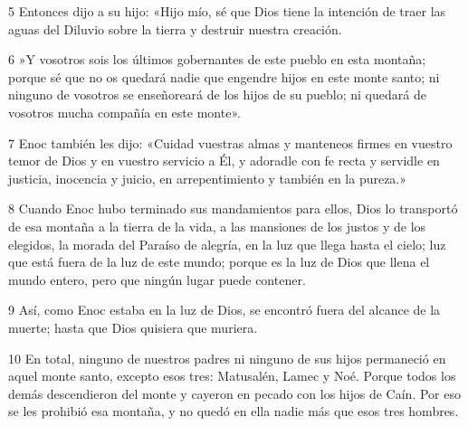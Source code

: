 \par 5 Entonces dijo a su hijo: «Hijo mío, sé que Dios tiene la intención de traer las aguas del Diluvio sobre la tierra y destruir nuestra creación.

\par 6 »Y vosotros sois los últimos gobernantes de este pueblo en esta montaña; porque sé que no os quedará nadie que engendre hijos en este monte santo; ni ninguno de vosotros se enseñoreará de los hijos de su pueblo; ni quedará de vosotros mucha compañía en este monte».

\par 7 Enoc también les dijo: «Cuidad vuestras almas y manteneos firmes en vuestro temor de Dios y en vuestro servicio a Él, y adoradle con fe recta y servidle en justicia, inocencia y juicio, en arrepentimiento y también en la pureza.»

\par 8 Cuando Enoc hubo terminado sus mandamientos para ellos, Dios lo transportó de esa montaña a la tierra de la vida, a las mansiones de los justos y de los elegidos, la morada del Paraíso de alegría, en la luz que llega hasta el cielo; luz que está fuera de la luz de este mundo; porque es la luz de Dios que llena el mundo entero, pero que ningún lugar puede contener.

\par 9 Así, como Enoc estaba en la luz de Dios, se encontró fuera del alcance de la muerte; hasta que Dios quisiera que muriera.

\par 10 En total, ninguno de nuestros padres ni ninguno de sus hijos permaneció en aquel monte santo, excepto esos tres: Matusalén, Lamec y Noé. Porque todos los demás descendieron del monte y cayeron en pecado con los hijos de Caín. Por eso se les prohibió esa montaña, y no quedó en ella nadie más que esos tres hombres.


